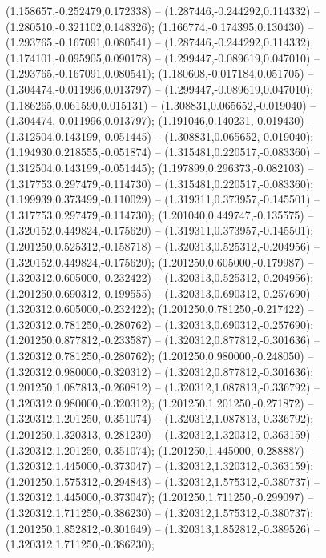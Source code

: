  (1.158657,-0.252479,0.172338) -- (1.287446,-0.244292,0.114332) -- (1.280510,-0.321102,0.148326);
 (1.166774,-0.174395,0.130430) -- (1.293765,-0.167091,0.080541) -- (1.287446,-0.244292,0.114332);
 (1.174101,-0.095905,0.090178) -- (1.299447,-0.089619,0.047010) -- (1.293765,-0.167091,0.080541);
 (1.180608,-0.017184,0.051705) -- (1.304474,-0.011996,0.013797) -- (1.299447,-0.089619,0.047010);
 (1.186265,0.061590,0.015131) -- (1.308831,0.065652,-0.019040) -- (1.304474,-0.011996,0.013797);
 (1.191046,0.140231,-0.019430) -- (1.312504,0.143199,-0.051445) -- (1.308831,0.065652,-0.019040);
 (1.194930,0.218555,-0.051874) -- (1.315481,0.220517,-0.083360) -- (1.312504,0.143199,-0.051445);
 (1.197899,0.296373,-0.082103) -- (1.317753,0.297479,-0.114730) -- (1.315481,0.220517,-0.083360);
 (1.199939,0.373499,-0.110029) -- (1.319311,0.373957,-0.145501) -- (1.317753,0.297479,-0.114730);
 (1.201040,0.449747,-0.135575) -- (1.320152,0.449824,-0.175620) -- (1.319311,0.373957,-0.145501);
 (1.201250,0.525312,-0.158718) -- (1.320313,0.525312,-0.204956) -- (1.320152,0.449824,-0.175620);
 (1.201250,0.605000,-0.179987) -- (1.320312,0.605000,-0.232422) -- (1.320313,0.525312,-0.204956);
 (1.201250,0.690312,-0.199555) -- (1.320313,0.690312,-0.257690) -- (1.320312,0.605000,-0.232422);
 (1.201250,0.781250,-0.217422) -- (1.320312,0.781250,-0.280762) -- (1.320313,0.690312,-0.257690);
 (1.201250,0.877812,-0.233587) -- (1.320312,0.877812,-0.301636) -- (1.320312,0.781250,-0.280762);
 (1.201250,0.980000,-0.248050) -- (1.320312,0.980000,-0.320312) -- (1.320312,0.877812,-0.301636);
 (1.201250,1.087813,-0.260812) -- (1.320312,1.087813,-0.336792) -- (1.320312,0.980000,-0.320312);
 (1.201250,1.201250,-0.271872) -- (1.320312,1.201250,-0.351074) -- (1.320312,1.087813,-0.336792);
 (1.201250,1.320313,-0.281230) -- (1.320312,1.320312,-0.363159) -- (1.320312,1.201250,-0.351074);
 (1.201250,1.445000,-0.288887) -- (1.320312,1.445000,-0.373047) -- (1.320312,1.320312,-0.363159);
 (1.201250,1.575312,-0.294843) -- (1.320312,1.575312,-0.380737) -- (1.320312,1.445000,-0.373047);
 (1.201250,1.711250,-0.299097) -- (1.320312,1.711250,-0.386230) -- (1.320312,1.575312,-0.380737);
 (1.201250,1.852812,-0.301649) -- (1.320313,1.852812,-0.389526) -- (1.320312,1.711250,-0.386230);
